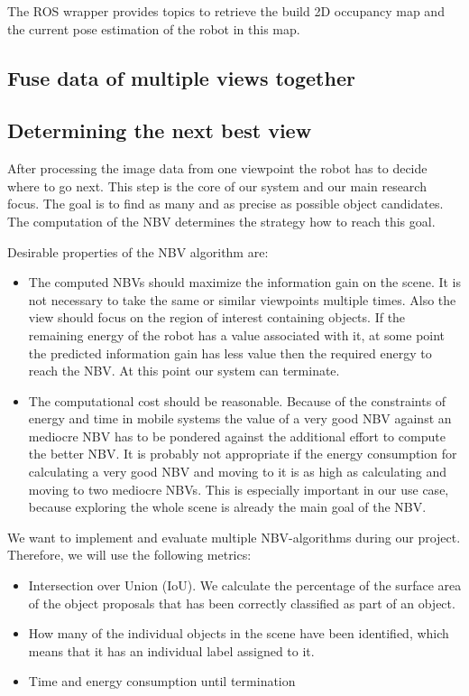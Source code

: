 \documentclass[a4paper,11pt,english]{article}
\begin{document}
The ROS wrapper provides topics to retrieve the build 2D occupancy map and the current pose estimation of the robot in this map.

\subsection{Fuse data of multiple views together}
\label{system:fusion}

\subsection{Determining the next best view}
\label{system:nbv}
After processing the image data from one viewpoint the robot has to decide where to go next.
This step is the core of our system and our main research focus.
The goal is to find as many and as precise as possible object candidates.
The computation of the NBV determines the strategy how to reach this goal.

Desirable properties of the NBV algorithm are:
\begin{itemize}
	\item The computed NBVs should maximize the information gain on the scene. It is not necessary to take the same or similar viewpoints multiple times. Also the view should focus on the region of interest containing objects. If the remaining energy of the robot has a value associated with it, at some point the predicted information gain has less value then the required energy to reach the NBV. At this point our system can terminate.
	\item The computational cost should be reasonable. Because of the constraints of energy and time in mobile systems the value of a very good NBV against an mediocre NBV has to be pondered against the additional effort to compute the better NBV. It is probably not appropriate if the energy consumption for calculating a very good NBV and moving to it is as high as calculating and moving to two mediocre NBVs. This is especially important in our use case, because exploring the whole scene is already the main goal of the NBV.
\end{itemize}

We want to implement and evaluate multiple NBV-algorithms during our project.
Therefore, we will use the following metrics:
\begin{itemize}
	\item Intersection over Union (IoU). We calculate the percentage of the surface area of the object proposals that has been correctly classified as part of an object.
	\item How many of the individual objects in the scene have been identified, which means that it has an individual label assigned to it.
	\item Time and energy consumption until termination
\end{itemize}
\end{document}

